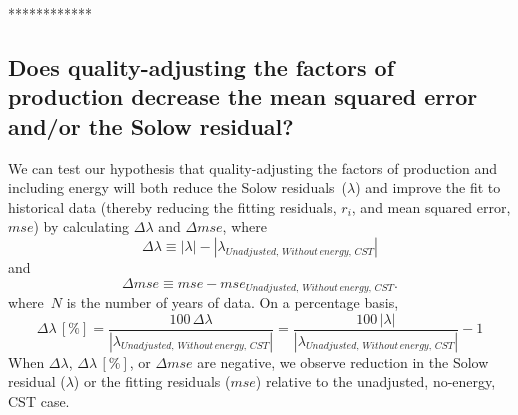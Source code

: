 \documentclass[preprint,authoryear,12pt]{elsarticle}\usepackage[]{graphicx}\usepackage[]{color}
\begin{document}
************


\subsection{Does quality-adjusting the factors of production 
            decrease the mean squared error and/or the Solow residual?} 
\label{sec:quality_adj_energy_and_solow_residual}

We can test our hypothesis that 
quality-adjusting the factors of production
and including energy will both reduce the Solow residuals~($\lambda$)
and improve the fit to historical data
(thereby reducing the fitting residuals, $r_i$, and mean squared error, $mse$)
by calculating 
$\Delta \lambda$ and $\Delta mse$, where
%
\begin{equation} \label{eq:delta_lambda}
  \Delta \lambda \equiv \left| \lambda \right| - \left| \lambda_{Unadjusted, \, Without \, energy, \, CST} \right|
\end{equation}
%
and
%
\begin{equation} \label{eq:delta_mse}
  \Delta mse \equiv mse - mse_{Unadjusted, \, Without \, energy, \, CST}.
\end{equation}
%
where~$N$ is the number of years of data.
On a percentage basis,
%
\begin{equation} \label{eq:delta_lambda_perc}
  \Delta \lambda \, [\%] = \frac{100 \, \Delta \lambda}{\left| \lambda_{Unadjusted, \, Without \, energy, \, CST} \right|} 
            = \frac{100 \, \left| \lambda \right|}{\left| \lambda_{Unadjusted, \, Without \, energy, \, CST} \right|} - 1
\end{equation}
%
When $\Delta \lambda$, $\Delta \lambda \, [\%]$, or $\Delta mse$ are negative, 
we observe reduction in the Solow residual ($\lambda$) or
the fitting residuals ($mse$)
relative to the unadjusted, no-energy, CST case.
\end{document}
